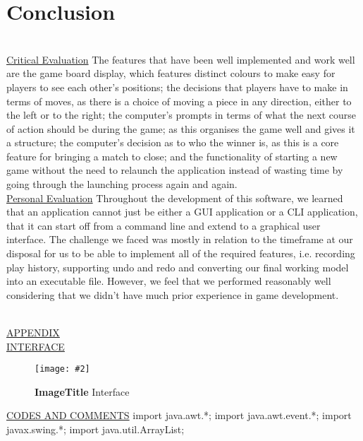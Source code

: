\documentclass[10pt, a4paper]{article}
\newcommand{\figuremacro}[5]{
    \begin{figure}[#1]
        \centering
        \texttt{[image: \#2]}
        \caption[#3]{\textbf{#3}#4}
        \label{fig:#2}
    \end{figure}
}
\begin{document}
\section{Conclusion}	
\\
\underline{Critical Evaluation} 
The features that have been well implemented and work well are the game board display, which features distinct colours to make easy for players to see each other’s positions; the decisions that players have to make in terms of moves, as there is a choice of moving a piece in any direction, either to the left or to the right; the computer’s prompts in terms of what the next course of action should be during the game; as this organises the game well and gives it a structure; the computer’s decision as to who the winner is, as this is a core feature for bringing a match to close; and the functionality of starting a new game without the need to relaunch the application instead of wasting time by going through the launching process again and again.
\\
\underline{Personal Evaluation} 
Throughout the development of this software, we learned that an application cannot just be either a GUI application or a CLI application, that it can start off from a command line and extend to a graphical user interface.
The challenge we faced was mostly in relation to the timeframe at our disposal for us to be able to implement all of the required features, i.e. recording play history, supporting undo and redo and converting our final working model into an executable file.
However, we feel that we performed reasonably well considering that we didn’t have much prior experience in game development.


\\
\underline{APPENDIX}
\\
\underline{INTERFACE}
\\
    \figuremacro{h}{placeholder}{ImageTitle}{ Interface}{1.0}

 
\underline{CODES AND COMMENTS}
import java.awt.*;
import java.awt.event.*;
import javax.swing.*;
import java.util.ArrayList;
\end{document}

